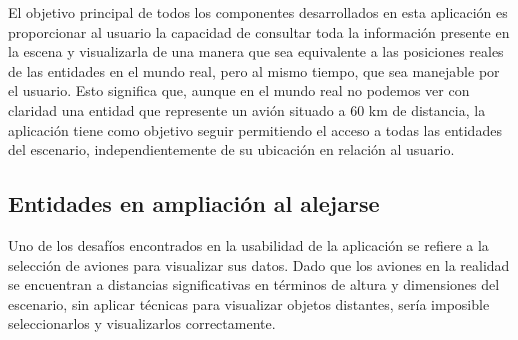 \documentclass[a4paper, 11pt]{book}
\begin{document}
El objetivo principal de todos los componentes desarrollados en esta aplicación es proporcionar al usuario la capacidad de consultar toda la información presente en la escena y visualizarla de una manera que sea equivalente a las posiciones reales de las entidades en el mundo real, pero al mismo tiempo, que sea manejable por el usuario. Esto significa que, aunque en el mundo real no podemos ver con claridad una entidad que represente un avión situado a 60 km de distancia, la aplicación tiene como objetivo seguir permitiendo el acceso a todas las entidades del escenario, independientemente de su ubicación en relación al usuario.
\subsection{Entidades en ampliación al alejarse}
\label{subsec:hover-scale}
Uno de los desafíos encontrados en la usabilidad de la aplicación se refiere a la selección de aviones para visualizar sus datos. Dado que los aviones en la realidad se encuentran a distancias significativas en términos de altura y dimensiones del escenario, sin aplicar técnicas para visualizar objetos distantes, sería imposible seleccionarlos y visualizarlos correctamente.
\end{document}
